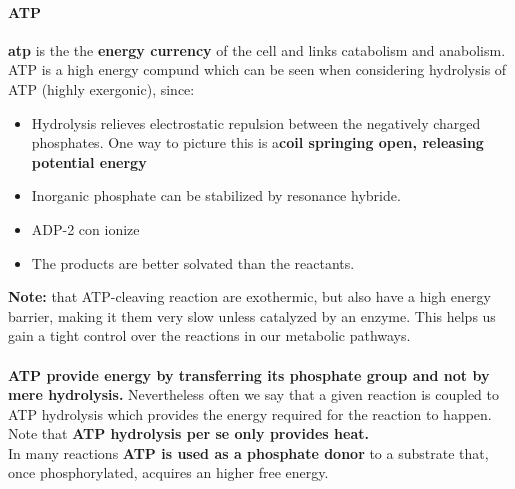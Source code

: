 \documentclass[../main.tex]{subfiles}
\begin{document}
\paragraph{ATP}
\textbf{\gls{atp}} is the the \textbf{energy currency} of the cell and links catabolism and anabolism. ATP is a high energy compund which can be seen when considering hydrolysis of ATP (highly exergonic), since: 
\begin{itemize}
	\item Hydrolysis relieves electrostatic repulsion between the negatively charged phosphates. One way to picture this is a\textbf{coil springing open, releasing potential energy}
	\item Inorganic phosphate can be stabilized by resonance hybride. 
	\item ADP-2 con ionize
	\item The products are better solvated than the reactants. 
\end{itemize} 
\textbf{Note:} that ATP-cleaving reaction are exothermic, but also have a high energy barrier, making it them very slow unless catalyzed by an enzyme. This helps us gain a tight control over the reactions in our metabolic pathways. \\
\\
\textbf{ATP provide energy by transferring its phosphate group and not by mere hydrolysis.} Nevertheless often we say that a given reaction is coupled to ATP hydrolysis which provides the energy required for the reaction to happen. Note that \textbf{ATP hydrolysis per se only provides heat.}\\
In many reactions \textbf{ATP is used as a phosphate donor} to a substrate that, once phosphorylated, acquires an higher free energy. 
\end{document}
